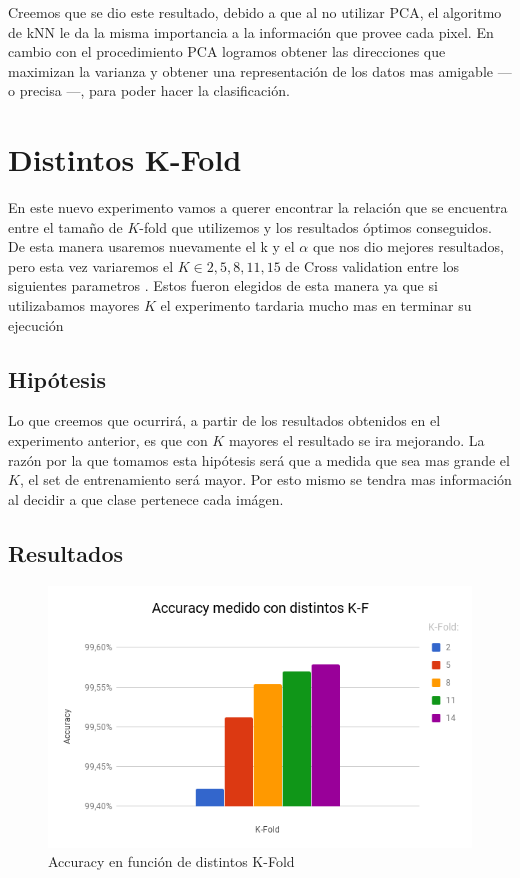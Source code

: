 Creemos que se dio este resultado, debido a que al no utilizar PCA, el algoritmo de kNN le da la misma importancia a la información que provee cada pixel. En cambio con el procedimiento PCA logramos obtener las direcciones que maximizan la varianza y obtener una representación de los datos mas amigable --- o precisa ---, para poder hacer la clasificación.

\section{Distintos K-Fold}

En este nuevo experimento vamos a querer encontrar la relación que se encuentra entre el tamaño de $K$-fold que utilizemos y los resultados óptimos conseguidos. De esta manera usaremos nuevamente el k y el $\alpha$ que nos dio mejores resultados, pero esta vez variaremos el $K \in {2,5,8,11,15}$ de Cross validation entre los siguientes parametros . Estos fueron elegidos de esta manera ya que si utilizabamos mayores $K$ el experimento tardaria mucho mas en terminar su ejecución


\subsection{Hipótesis}

Lo que creemos que ocurrirá, a partir de los resultados obtenidos en el experimento anterior, es que con $K$ mayores el resultado se ira mejorando. La razón por la que tomamos esta hipótesis será que a medida que sea mas grande el $K$, el set de entrenamiento será mayor. Por esto mismo se tendra mas información al decidir a que clase pertenece cada imágen.

\subsection{Resultados}

\begin{figure}
	\centering
	\includegraphics[width=\textwidth]{graficos/Distintos_kfold.png}
	\caption{Accuracy en función de distintos K-Fold}
	\label{fig:distintos_kfold}
\end{figure}

